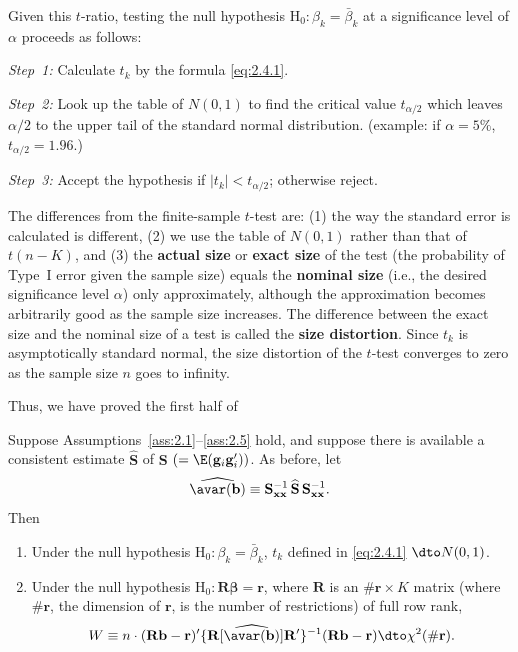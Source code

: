 Given this $t$-ratio, testing the null hypothesis
$\mathrm{H}_0\colon \beta_k = \bar{\beta}_k$ at a significance level of $\alpha$
proceeds as follows:

\smallskip
\noindent\emph{Step~1:} Calculate $t_k$ by the formula \eqref{eq:2.4.1}.

\noindent\emph{Step~2:} Look up the table of $N(0,1)$ to find the critical value
$t_{\alpha/2}$ which leaves $\alpha/2$ to the upper tail of the standard normal
distribution.  (example: if $\alpha = 5\%$, $t_{\alpha/2} = 1.96$.)

\noindent\emph{Step~3:} Accept the hypothesis if $|t_k| < t_{\alpha/2}$; otherwise
reject.

\smallskip
The differences from the finite-sample $t$-test are: (1) the way the standard error
is calculated is different, (2) we use the table of $N(0,1)$ rather than that of
$t(n-K)$, and (3) the \textbf{actual size} or \textbf{exact size} of the test (the
probability of Type~I error given the sample size) equals the \textbf{nominal size}
(i.e., the desired significance level $\alpha$) only approximately, although the
approximation becomes arbitrarily good as the sample size increases.  The difference
between the exact size and the nominal size of a test is called the \textbf{size
distortion}.  Since $t_k$ is asymptotically standard normal, the size distortion of
the $t$-test converges to zero as the sample size $n$ goes to infinity.

Thus, we have proved the first half of

\begin{proposition}
\label{prop:2.3}
Suppose Assumptions~\ref{ass:2.1}--\ref{ass:2.5} hold, and suppose there is
available a consistent estimate $\widehat{\mathbf{S}}$ of\/
$\mathbf{S}$ $(= \E(\mathbf{g}_i\mathbf{g}_i'))$.  As before, let
\[
  \widehat{\avar(\mathbf{b})}
  \equiv \mathbf{S}_{\mathbf{xx}}^{-1}\,\widehat{\mathbf{S}}\,
  \mathbf{S}_{\mathbf{xx}}^{-1}.
\]
Then
\begin{enumerate}[label=(\alph*)]
  \item Under the null hypothesis $\mathrm{H}_0\colon \beta_k = \bar{\beta}_k$,
    $t_k$ defined in \eqref{eq:2.4.1} $\dto N(0,1)$.
  \item Under the null hypothesis
    $\mathrm{H}_0\colon \mathbf{R}\bm{\beta} = \mathbf{r}$, where $\mathbf{R}$ is an
    $\#\mathbf{r} \times K$ matrix (where $\#\mathbf{r}$, the dimension of\/
    $\mathbf{r}$, is the number of restrictions) of full row rank,
    \begin{equation}
      W \equiv n \cdot (\mathbf{R}\mathbf{b} - \mathbf{r})'
      \{\mathbf{R}[\widehat{\avar(\mathbf{b})}]\mathbf{R}'\}^{-1}
      (\mathbf{R}\mathbf{b} - \mathbf{r})
      \dto \chi^2(\#\mathbf{r}).
      \label{eq:2.4.2}
    \end{equation}
\end{enumerate}
\end{proposition}

